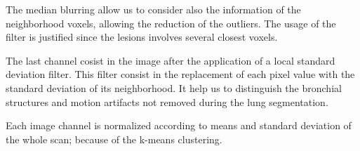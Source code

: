 \documentclass{standalone}
\begin{document}
		The median blurring allow us to consider also the information of the neighborhood voxels, allowing the reduction of the outliers. The usage of the filter is justified since the lesions involves several closest voxels.
		
		The last channel cosist in the image after the application of a local standard deviation filter. This filter consist in the replacement of each pixel value with the standard deviation of its neighborhood. It help us to distinguish the bronchial structures and motion artifacts not removed during the lung segmentation.	
		
		Each image channel is normalized according to means and standard deviation of the whole scan; because of the k-means clustering.
\end{document}
